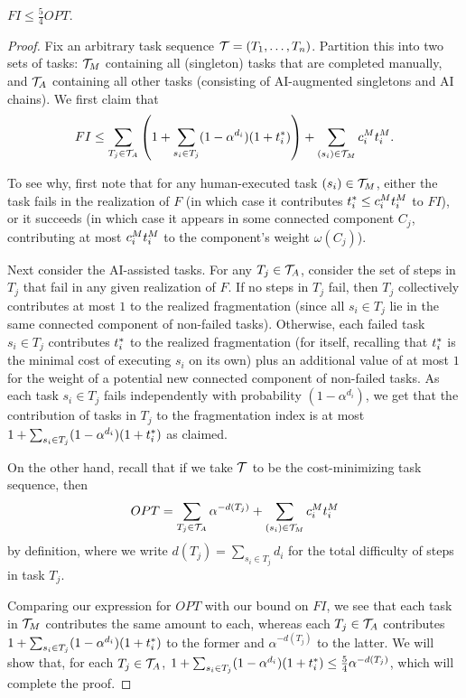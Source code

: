 \begin{lem}
\label{lem:FI.upper.bound}
    $FI \leq \tfrac{5}{4}OPT$.
\end{lem}
\begin{proof}
Fix an arbitrary task sequence $\mathcal{T} = (T_1, \dotsc, T_n)$.
Partition this into two sets of tasks: $\mathcal{T}_{M}$ containing all (singleton) tasks that are completed manually, and $\mathcal{T}_{A}$ containing all other tasks (consisting of AI-augmented singletons and AI chains).
We first claim that
\[ FI \leq \sum_{T_j \in \mathcal{T}_{A}}\left(1 + \sum_{s_i \in T_j}(1-\alpha^{d_i})(1+t^*_{i})\right) + \sum_{(s_i) \in \mathcal{T}_{M}}c^{M}_{i}t^{M}_{i}. \]

To see why, first note that for any human-executed task $(s_i) \in \mathcal{T}_{M}$, either the task fails in the realization of $F$ (in which case it contributes $t^*_{i} \leq c^{M}_{i}t^{M}_{i}$ to $FI$), or it succeeds (in which case it appears in some connected component $C_j$, contributing at most $c^{M}_{i}t^{M}_{i}$ to the component's weight $\omega(C_j)$).

Next consider the AI-assisted tasks.
For any $T_j \in \mathcal{T}_{A}$, consider the set of steps in $T_j$ that fail in any given realization of $F$.
If no steps in $T_j$ fail, then $T_j$ collectively contributes at most $1$ to the realized fragmentation (since all $s_i \in T_j$ lie in the same connected component of non-failed tasks).
Otherwise, each failed task $s_i \in T_j$ contributes $t^*_{i}$ to the realized fragmentation (for itself, recalling that $t^*_{i}$ is the minimal cost of executing $s_i$ on its own) plus an additional value of at most $1$ for the weight of a potential new connected component of non-failed tasks.
As each task $s_i \in T_j$ fails independently with probability $(1-\alpha^{d_i})$, we get that the contribution of tasks in $T_j$ to the fragmentation index is at most $1 + \sum_{s_i \in T_j}(1-\alpha^{d_i})(1+t^*_{i})$ as claimed.

On the other hand, recall that if we take $\mathcal{T}$ to be the cost-minimizing task sequence, then
\[ OPT = \sum_{T_j \in \mathcal{T}_{A}} \alpha^{-d(T_j)} + \sum_{(s_i) \in \mathcal{T}_{M}} c^{M}_{i}t^{M}_{i} \]
by definition, where we write $d(T_j) = \sum_{s_i \in T_j}d_i$ for the total difficulty of steps in task $T_j$.

Comparing our expression for $OPT$ with our bound on $FI$, we see that each task in $\mathcal{T}_{M}$ contributes the same amount to each, whereas each $T_j \in \mathcal{T}_{A}$ contributes $1+\sum_{s_i \in T_j}(1-\alpha^{d_i})(1+t^*_{i})$ to the former and $\alpha^{-d(T_j)}$ to the latter.
We will show that, for each $T_j \in \mathcal{T}_{A}$, $1 + \sum_{s_i \in T_j}(1-\alpha^{d_i})(1+t^*_{i}) \leq \frac{5}{4} \alpha^{-d(T_j)}$, which will complete the proof.


\end{proof}
